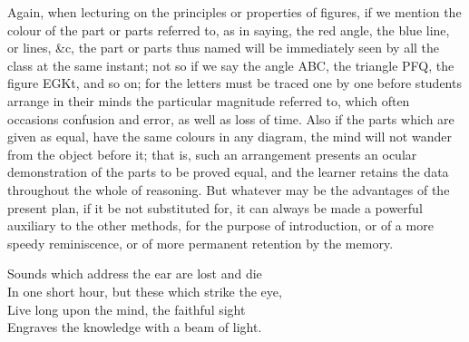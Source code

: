 \documentclass[booklanguage=english]{byrnebook}
\begin{document}
Again, when lecturing on the principles or properties of figures, if we mention the colour of the part or parts referred to, as in saying, the red angle, the blue line, or lines, \&c, the part or parts thus named will be immediately seen by all the class at the same instant; not so if we say the angle ABC, the triangle PFQ, the figure EGKt, and so on; for the letters must be traced one by one before students arrange in their minds the particular magnitude referred to, which often occasions confusion and error, as well as loss of time. Also if the parts which are given as equal, have the same colours in any diagram, the mind will not wander from the object before it; that is, such an arrangement presents an ocular demonstration of the parts to be proved equal, and the learner retains the data throughout the whole of reasoning. But whatever may be the advantages of the present plan, if it be not substituted for, it can always be made a powerful auxiliary to the other methods, for the purpose of introduction, or of a more speedy reminiscence, or of more permanent retention by the memory.


\baselineskip

\begin{center} %
Sounds which address the ear are lost and die\\
In one short hour, but these which strike the eye,\\
Live long upon the mind, the faithful sight\\
Engraves the knowledge with a beam of light.
\end{center}
\end{document}
